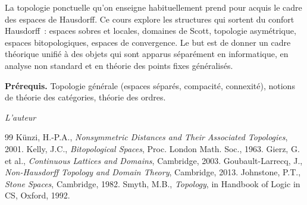 \documentclass[12pt,a4paper,twoside]{book}
\theoremstyle{definition}
\theoremstyle{plain}
\theoremstyle{remark}
\begin{document}
\medskip

La topologie ponctuelle qu'on enseigne habituellement prend pour acquis le cadre des espaces de Hausdorff. Ce cours explore les structures qui sortent du confort Hausdorff~: espaces sobres et locales, domaines de Scott, topologie asym\'etrique, espaces bitopologiques, espaces de convergence. Le but est de donner un cadre th\'eorique unifi\'e \`a des objets qui sont apparus s\'epar\'ement en informatique, en analyse non standard et en th\'eorie des points fixes g\'en\'eralis\'es.

\medskip

\noindent\textbf{Pr\'erequis.} Topologie g\'en\'erale (espaces s\'epar\'es, compacit\'e, connexit\'e), notions de th\'eorie des cat\'egories, th\'eorie des ordres.

\vfill
\hfill\textit{L'auteur}


\mainmatter













\backmatter
\begin{thebibliography}{99}
 K\"unzi, H.-P.A., \emph{Nonsymmetric Distances and Their Associated Topologies}, 2001.
 Kelly, J.C., \emph{Bitopological Spaces}, Proc. London Math. Soc., 1963.
 Gierz, G. et al., \emph{Continuous Lattices and Domains}, Cambridge, 2003.
 Goubault-Larrecq, J., \emph{Non-Hausdorff Topology and Domain Theory}, Cambridge, 2013.
 Johnstone, P.T., \emph{Stone Spaces}, Cambridge, 1982.
 Smyth, M.B., \emph{Topology}, in Handbook of Logic in CS, Oxford, 1992.
\end{thebibliography}
\printindex
\end{document}
